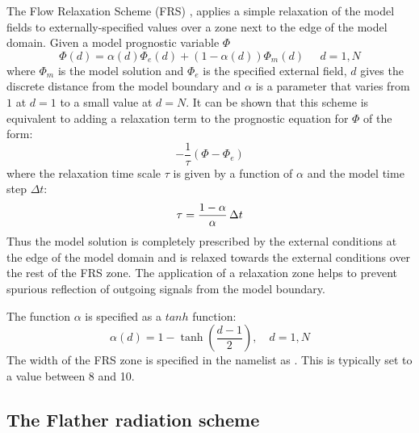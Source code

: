 The Flow Relaxation Scheme (FRS) \citep{Davies_QJRMS76,Engerdahl_Tel95},
applies a simple relaxation of the model fields to
externally-specified values over a zone next to the edge of the model
domain. Given a model prognostic variable $\Phi$ 
\begin{equation}  \label{Eq_bdy_frs1}
\Phi(d) = \alpha(d)\Phi_{e}(d) + (1-\alpha(d))\Phi_{m}(d)\;\;\;\;\; d=1,N
\end{equation}
where $\Phi_{m}$ is the model solution and $\Phi_{e}$ is the specified
external field, $d$ gives the discrete distance from the model
boundary  and $\alpha$ is a parameter that varies from $1$ at $d=1$ to
a small value at $d=N$. It can be shown that this scheme is equivalent
to adding a relaxation term to the prognostic equation for $\Phi$ of
the form:
\begin{equation}  \label{Eq_bdy_frs2}
-\frac{1}{\tau}\left(\Phi - \Phi_{e}\right)
\end{equation}
where the relaxation time scale $\tau$ is given by a function of
$\alpha$ and the model time step $\Delta t$:
\begin{equation}  \label{Eq_bdy_frs3}
\tau = \frac{1-\alpha}{\alpha}  \,\Delta t
\end{equation}
Thus the model solution is completely prescribed by the external
conditions at the edge of the model domain and is relaxed towards the
external conditions over the rest of the FRS zone. The application of
a relaxation zone helps to prevent spurious reflection of outgoing
signals from the model boundary. 

The function $\alpha$ is specified as a $tanh$ function:
\begin{equation}  \label{Eq_bdy_frs4}
\alpha(d) = 1 - \tanh\left(\frac{d-1}{2}\right),       \quad d=1,N
\end{equation}
The width of the FRS zone is specified in the namelist as 
. This is typically set to a value between 8 and 10. 

\subsection{The Flather radiation scheme}
\label{BDY_flather_scheme}

